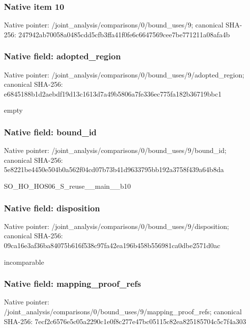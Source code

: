 \documentclass[10pt,a4paper]{article}
\begin{document}
\subsubsection{Native item 10}
Native pointer: /joint\_\allowbreak{}analysis/comparisons/0/bound\_\allowbreak{}uses/9; canonical SHA-256: 247942ab70058a0485cdd5cfb3ffa41f0fe6c6647569cee7be771211a08afa4b

\subsubsection{Native field: adopted\_\allowbreak{}region}
Native pointer: /joint\_\allowbreak{}analysis/comparisons/0/bound\_\allowbreak{}uses/9/adopted\_\allowbreak{}region; canonical SHA-256: e6845188b1d2aebdf19d13c1613d7a49b5806a7fe336ec775fa182b36719bbc1

\begingroup\raggedright\sloppy empty\par\endgroup

\subsubsection{Native field: bound\_\allowbreak{}id}
Native pointer: /joint\_\allowbreak{}analysis/comparisons/0/bound\_\allowbreak{}uses/9/bound\_\allowbreak{}id; canonical SHA-256: 5e8221be4450e504b0a562f04cd07b73b41d9633795bb192a3758f439a64b8da

\begingroup\raggedright\sloppy SO\_\allowbreak{}HO\_\allowbreak{}HOS06\_\allowbreak{}S\_\allowbreak{}reuse\_\allowbreak{}\_\allowbreak{}main\_\allowbreak{}\_\allowbreak{}b10\par\endgroup

\subsubsection{Native field: disposition}
Native pointer: /joint\_\allowbreak{}analysis/comparisons/0/bound\_\allowbreak{}uses/9/disposition; canonical SHA-256: 09ca16e3af36ba84075b616f538c97fa42ea196b458b556981ca0dbe2571d0ac

\begingroup\raggedright\sloppy incomparable\par\endgroup

\subsubsection{Native field: mapping\_\allowbreak{}proof\_\allowbreak{}refs}
Native pointer: /joint\_\allowbreak{}analysis/comparisons/0/bound\_\allowbreak{}uses/9/mapping\_\allowbreak{}proof\_\allowbreak{}refs; canonical SHA-256: 7ecf2c6576e5c05a2290c1e0f8c277e47bc05115c82ea825185704c5c7f4a303
\end{document}
